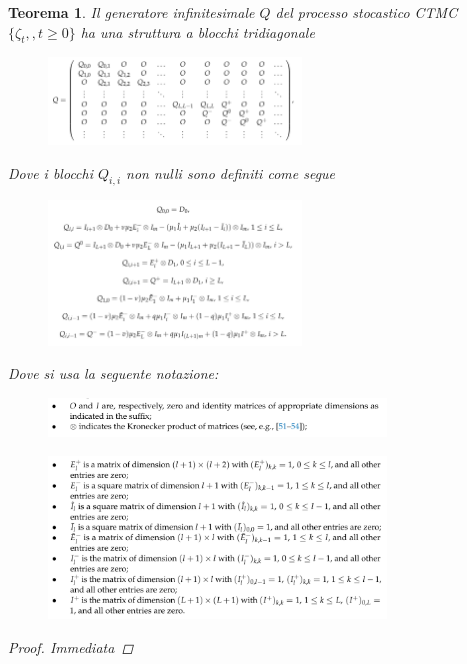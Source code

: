 \documentclass[11pt]{article}
\newtheorem{teorema}{Teorema}[section]
\begin{document}
\clearpage
\begin{teorema}
    Il generatore infinitesimale $Q$ del processo stocastico CTMC $\{\zeta_t,,t\geq 0\}$ ha una struttura a blocchi tridiagonale

    \begin{figure}[h]
        \centering
        \includegraphics[width=0.6\textwidth]{E9pbGl1.png}
        \label{fig:generatore_infinitesimale}
    \end{figure}

    \noindent Dove i blocchi $Q_{i,i}$ non nulli sono definiti come segue

    \begin{figure}[h]
        \centering
        \includegraphics[width=0.6\textwidth]{T9RIVqa.png}
    \end{figure}

    \noindent Dove si usa la seguente notazione:

    \begin{figure}[h]
        \centering
        \includegraphics[width=0.8\textwidth]{avNOocE.png}
    \end{figure}

    \begin{figure}[h!]
        \centering
        \includegraphics[width=0.8\textwidth]{px6kcg9.png}
    \end{figure}

    \begin{proof}
        Immediata
    \end{proof}

\end{teorema}
\clearpage
\end{document}
